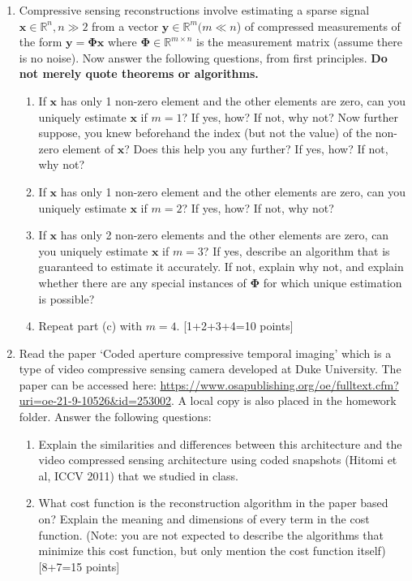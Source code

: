 \documentclass[11pt]{article}
\begin{document}
\begin{enumerate}
\item Compressive sensing reconstructions involve estimating a sparse signal $\mathbf{x} \in \mathbb{R}^n, n \gg 2$ from a vector $\mathbf{y} \in \mathbb{R}^m (m \ll n$) of compressed measurements of the form $\mathbf{y} = \mathbf{\Phi x}$ where $\mathbf{\Phi} \in \mathbb{R}^{m \times n}$ is the measurement matrix (assume there is no noise). Now answer the following questions, from first principles. \textbf{Do not merely quote theorems or algorithms.}
\begin{enumerate}
\item If $\mathbf{x}$ has only 1 non-zero element and the other elements are zero, can you uniquely estimate $\mathbf{x}$ if $m = 1$? If yes, how? If not, why not? Now further suppose, you knew beforehand the index (but not the value) of the non-zero element of $\mathbf{x}$? Does this help you any further? If yes, how? If not, why not?
\item If $\mathbf{x}$ has only 1 non-zero element and the other elements are zero, can you uniquely estimate $\mathbf{x}$ if $m = 2$? If yes, how? If not, why not? 
\item If $\mathbf{x}$ has only 2 non-zero elements and the other elements are zero, can you uniquely estimate $\mathbf{x}$ if $m = 3$? If yes, describe an algorithm that is guaranteed to estimate it accurately. If not, explain why not, and explain whether there are any special instances of $\mathbf{\Phi}$ for which unique estimation is possible? 
\item Repeat part (c) with $m = 4$.  \textsf{[1+2+3+4=10 points]}
\end{enumerate} 

\item Read the paper `Coded aperture compressive temporal imaging' which is a type of video compressive sensing camera developed at Duke University. The paper can be accessed here: \url{https://www.osapublishing.org/oe/fulltext.cfm?uri=oe-21-9-10526&id=253002}. A local copy is also placed in the homework folder. Answer the following questions:
\begin{enumerate}
\item Explain the similarities and differences between this architecture and the video compressed sensing architecture using coded snapshots (Hitomi et al, ICCV 2011) that we studied in class. 
\item What cost function is the reconstruction algorithm in the paper based on? Explain the meaning and dimensions of every term in the cost function. (Note: you are not expected to describe the algorithms that minimize this cost function, but only mention the cost function itself) \textsf{[8+7=15 points]}
\end{enumerate} 


\end{enumerate}
\end{document}
